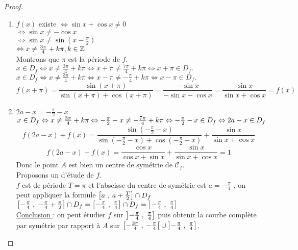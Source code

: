 \begin{proof}
\begin{enumerate}
\item $ f(x) $ existe    $\Leftrightarrow \sin x+\cos x \neq 0  $\\
 $\Leftrightarrow \sin x \neq -\cos x $\\
 $\Leftrightarrow \sin x \neq \sin (x- \frac{\pi}{2}) $\\
 $ \Leftrightarrow x\neq \frac{3\pi}{4}+ k\pi , k\in \mathbb{Z}$\\
 Montrons que $ \pi $ est la période de $ f. $\\
 $ x \in D_{f}\Leftrightarrow x\neq \frac{3\pi}{4}+ k\pi \Leftrightarrow x+\pi\neq \frac{7\pi}{4}+ k\pi \Leftrightarrow x+\pi\in D_{f}.$\\
  $ x \in D_{f}\Leftrightarrow x\neq \frac{3\pi}{4}+ k\pi \Leftrightarrow x-\pi\neq -\frac{\pi}{4}+ k\pi \Leftrightarrow x-\pi\in D_{f}.$\\
 $ f(x+\pi)=\dfrac{\sin (x+\pi) }{\sin (x+\pi)+\cos (x+\pi)}= \dfrac{-\sin x }{-\sin x-\cos x}=\dfrac{\sin x }{\sin x+\cos x}=f(x)$
 \item $ 2a-x=-\frac{\pi}{2}-x $\\
  $ x \in D_{f}\Leftrightarrow x\neq \frac{3\pi}{4}+ k\pi \Leftrightarrow -\frac{\pi}{2}-x \neq -\frac{7\pi}{4}+ k\pi \Leftrightarrow -\frac{\pi}{2}-x\in D_{f} \\\Leftrightarrow 2a-x\in D_{f}$
 $$ f(2a-x)+f(x)= \dfrac{\sin (-\frac{\pi}{2}-x ) }{\sin (-\frac{\pi}{2}-x )+\cos (-\frac{\pi}{2}-x )}+\dfrac{\sin x }{\sin x+\cos x} $$
 $$ f(2a-x)+f(x)= \dfrac{\cos x }{\cos x +\sin x }+\dfrac{\sin x }{\sin x+\cos x}=1 $$
 Donc le point $ A $ est bien un centre de symétrie de $ \mathcal{C}_{f} $.\\
 Proposons un d'étude   de $f. $\\
$ f $ est de période $ T= \pi$ et l'abscisse  du centre de symétrie est $ a=-\frac{\pi}{4}  $ , on peut appliquer la formule $ \left[a\;,\; a+\frac{T}{2}\right]\cap D_{f} $ \\
$ \left[-\frac{\pi}{4}\;,\; -\frac{\pi}{4}+\frac{\pi}{2}\right]\cap D_{f} =\left[-\frac{\pi}{4}\;,\; \frac{\pi}{4}\right]\cap D_{f}=\left]-\frac{\pi}{4} \;, \;\frac{\pi}{4}\right]$\\
\underline{Conclusion }: on peut étudier $ f $ sur $\left]-\frac{\pi}{4} \;, \;\frac{\pi}{4}\right]$ puis obtenir la courbe complète par symétrie par rapport à $ A $ sur $ \left[-\frac{3\pi}{4} \;,\; -\frac{\pi}{4}\right[\cup \left]-\frac{\pi}{4} \;, \;\frac{\pi}{4}\right] $.
 
 
\end{enumerate}
\end{proof}

